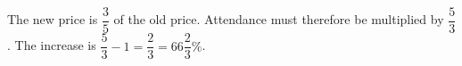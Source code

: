 The new price is $\dfrac{3}{5}$ of the old price. Attendance must therefore be multiplied by $\dfrac{5}{3}$. The increase is $\dfrac{5}{3}-1=\dfrac{2}{3}=\boxed{66\dfrac{2}{3}\%}$.

